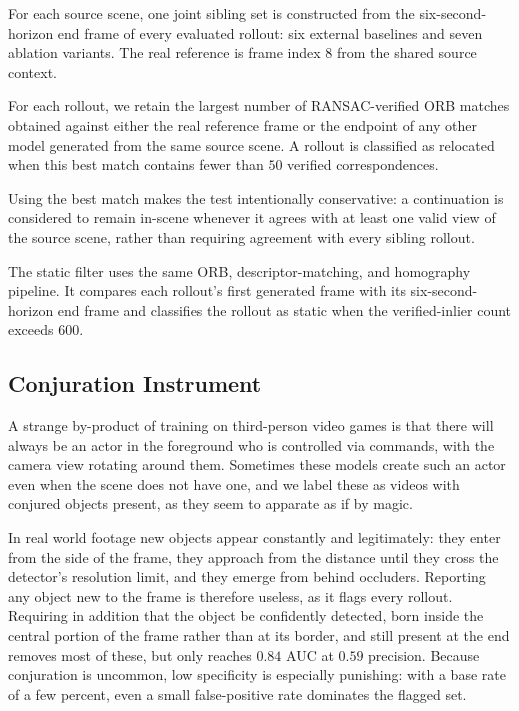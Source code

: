 For each source scene, one joint sibling set is constructed from the
six-second-horizon end frame of every evaluated rollout: six external
baselines and seven ablation variants. The real reference is frame index $8$
from the shared source context.

For each rollout, we retain the largest number of RANSAC-verified ORB matches
obtained against either the real reference frame or the endpoint of any other
model generated from the same source scene. A rollout is classified as
relocated when this best match contains fewer than $50$ verified
correspondences.

Using the best match makes the test intentionally conservative: a continuation
is considered to remain in-scene whenever it agrees with at least one valid
view of the source scene, rather than requiring agreement with every sibling
rollout.

The static filter uses the same ORB, descriptor-matching, and homography
pipeline. It compares each rollout's first generated frame with its
six-second-horizon end frame and classifies the rollout as static when the
verified-inlier count exceeds $600$.


\subsection{Conjuration Instrument}
\label{app:conjuration_instrument}

A strange by-product of training on third-person video games is that there will always be an
actor in the foreground who is controlled via commands, with the camera view rotating around
them. Sometimes these models create such an actor even when the scene does not have one, and we
label these as videos with conjured objects present, as they seem to apparate as if by magic.

In real world footage new objects appear constantly and legitimately: they enter from the side of
the frame, they approach from the distance until they cross the detector's resolution limit,
and they emerge from behind occluders. Reporting any object new to the frame is therefore
useless, as it flags every rollout. Requiring in addition
that the object be confidently detected, born inside the central portion of the frame rather
than at its border, and still present at the end removes most of these, but only reaches $0.84$
AUC at $0.59$ precision. Because conjuration is uncommon, low specificity is especially
punishing: with a base rate of a few percent, even a small false-positive rate dominates the
flagged set.

